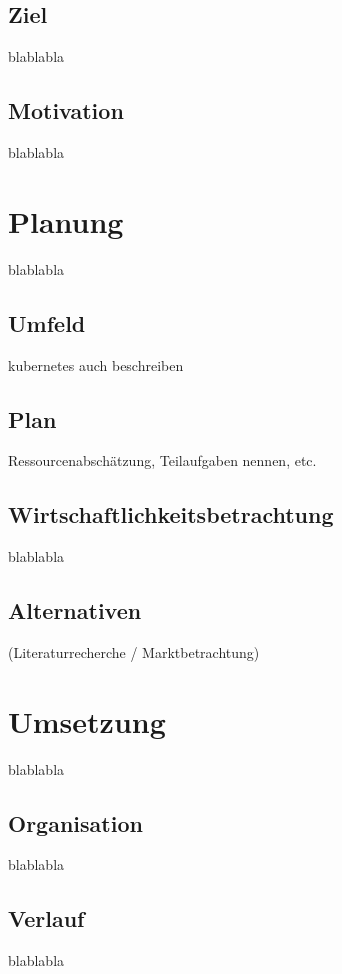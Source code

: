 \subsection{Ziel}
\label{subsec:description:ziel}
blablabla

\subsection{Motivation}
\label{subsec:description:motivation}
blablabla

\section{Planung}
\label{sec:description:planung}
blablabla

\subsection{Umfeld}
\label{subsec:description:umfeld}
kubernetes auch beschreiben

\subsection{Plan}
\label{subsec:description:plan}
Ressourcenabschätzung, Teilaufgaben nennen, etc.

\subsection{Wirtschaftlichkeitsbetrachtung}
\label{subsec:description:wirtschaftlichkeitsbetrachtung}
blablabla

\subsection{Alternativen}
\label{subsec:description:alternativen}
(Literaturrecherche / Marktbetrachtung)

\section{Umsetzung}
\label{sec:description:umsetzung}
blablabla

\subsection{Organisation}
\label{subsec:description:Organisation}
blablabla

\subsection{Verlauf}
\label{subsec:description:verlauf}
blablabla

